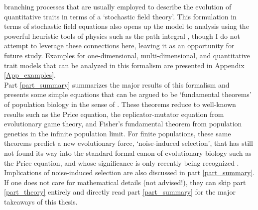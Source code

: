 branching processes that are usually employed to describe the evolution of quantitative traits \citep{champagnat_unifying_2006,etheridge_mathematical_2011, week_white_2021} in terms of a `stochastic field theory'. This formulation in terms of stochastic field equations also opens up the model to analysis using the powerful heuristic tools of physics such as the path integral \citep{doi_second_1976, peliti_path_1985, dodd_many-body_2009, chow_path_2015, weber_master_2017}, though I do not attempt to leverage these connections here, leaving it as an opportunity for future study. Examples for one-dimensional, multi-dimensional, and quantitative trait models that can be analyzed in this formalism are presented in Appendix \ref{App_examples}.\\
Part \ref{part_summary} summarizes the major results of this formalism and presents some simple equations that can be argued to be `fundamental theorems' of population biology in the sense of \cite{queller_fundamental_2017}. These theorems reduce to well-known results such as the Price equation, the replicator-mutator equation from evolutionary game theory, and Fisher's fundamental theorem from population genetics in the infinite population limit. For finite populations, these same theorems predict a new evolutionary force, `noise-induced selection', that has still not found its way into the standard formal canon of evolutionary biology such as the Price equation, and whose significance is only recently being recognized \citep{constable_demographic_2016,mcleod_social_2019,mazzolini_universality_2022, kuosmanen_turnover_2022}. Implications of noise-induced selection are also discussed in part \ref{part_summary}. If one does not care for mathematical details (not advised!), they can skip part \ref{part_theory} entirely and directly read part \ref{part_summary} for the major takeaways of this thesis.

